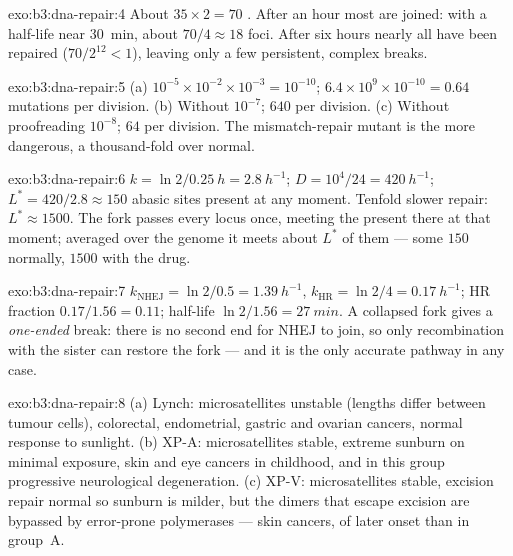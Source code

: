\begin{solution}{exo:b3:dna-repair:4}
About $35\times 2 = 70$ . After an hour most are
joined: with a half-life near \qty{30}{min}, about $70/4 \approx 18$
foci. After six hours nearly all have been repaired ($70/2^{12} < 1$),
leaving only a few persistent, complex breaks.
\end{solution}

\begin{solution}{exo:b3:dna-repair:5}
(a) $10^{-5}\times 10^{-2}\times 10^{-3} = 10^{-10}$; $6.4\times
10^{9}\times 10^{-10} = 0.64$ mutations per division. (b) Without
 $10^{-7}$; $640$ per division. (c) Without proofreading
$10^{-8}$; $64$ per division. The mismatch-repair mutant is the more
dangerous, a thousand-fold over normal.
\end{solution}

\begin{solution}{exo:b3:dna-repair:6}
$k = \ln 2/\qty{0.25}{h} = \qty{2.8}{h^{-1}}$; $D = 10^{4}/24 =
\qty{420}{h^{-1}}$; $L^{*} = 420/2.8 \approx 150$ abasic sites present
at any moment. Tenfold slower repair: $L^{*} \approx \num{1500}$. The
fork passes every locus once, meeting the  present there at
that moment; averaged over the genome it meets about $L^{*}$ of them
--- some $150$ normally, $\num{1500}$ with the drug.
\end{solution}

\begin{solution}{exo:b3:dna-repair:7}
$k_{\text{NHEJ}} = \ln 2/0.5 = \qty{1.39}{h^{-1}}$, $k_{\text{HR}} =
\ln 2/4 = \qty{0.17}{h^{-1}}$; HR fraction $0.17/1.56 = 0.11$;
half-life $\ln 2/1.56 = \qty{27}{min}$. A collapsed fork gives a
\emph{one-ended} break: there is no second end for NHEJ to join, so
only recombination with the sister can restore the fork --- and it is
the only accurate pathway in any case.
\end{solution}

\begin{solution}{exo:b3:dna-repair:8}
(a) Lynch: microsatellites unstable (lengths differ between tumour
cells), colorectal, endometrial, gastric and ovarian cancers, normal
response to sunlight. (b) XP-A: microsatellites stable, extreme
sunburn on minimal exposure, skin and eye cancers in childhood, and
in this group progressive neurological degeneration. (c) XP-V:
microsatellites stable, excision repair normal so sunburn is milder,
but the dimers that escape excision are bypassed by error-prone
polymerases --- skin cancers, of later onset than in group~A.
\end{solution}

